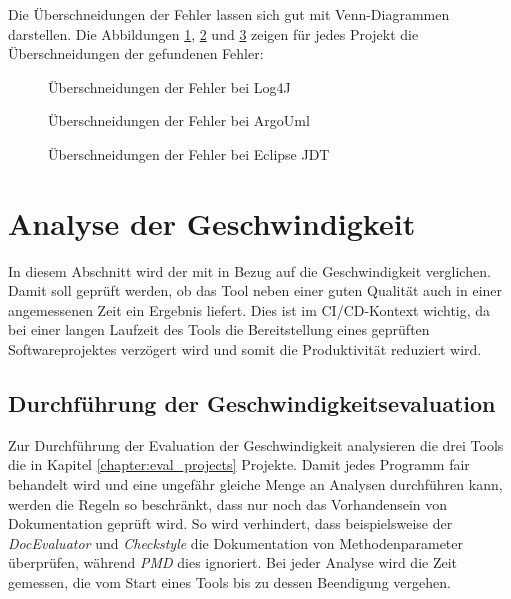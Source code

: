 Die Überschneidungen der Fehler lassen sich gut mit Venn-Diagrammen darstellen.  Die Abbildungen \ref{fig:log4j_venn}, \ref{fig:argo_venn} und  \ref{fig:eclipse_venn} zeigen für jedes Projekt die Überschneidungen der gefundenen Fehler:



\begin{figure}
    \centering

    \caption{Überschneidungen der Fehler bei Log4J}
    \label{fig:log4j_venn}
\end{figure}

\begin{figure}
    \centering

    \caption{Überschneidungen der Fehler bei ArgoUml}
    \label{fig:argo_venn}
\end{figure}
\begin{figure}
    \centering

    \caption{Überschneidungen der Fehler bei Eclipse JDT}
    \label{fig:eclipse_venn}
\end{figure}

\clearpage
 \section{Analyse der Geschwindigkeit}
 In diesem Abschnitt wird der \doceval mit \checkpmd in Bezug auf die Geschwindigkeit verglichen. Damit soll geprüft werden, ob das Tool neben einer guten Qualität auch in einer angemessenen Zeit ein Ergebnis liefert. Dies ist im \ac{CI/CD}-Kontext wichtig, da bei einer langen Laufzeit des Tools  die Bereitstellung eines geprüften Softwareprojektes verzögert wird und somit die Produktivität reduziert wird. 
 
 \subsection{Durchführung der Geschwindigkeitsevaluation}
 Zur Durchführung der Evaluation der Geschwindigkeit analysieren die drei Tools die in Kapitel \ref{chapter:eval_projects} Projekte. Damit jedes Programm fair behandelt wird und eine ungefähr gleiche Menge an Analysen durchführen kann, werden die Regeln so beschränkt, dass nur noch das Vorhandensein von Dokumentation geprüft wird. So wird verhindert, dass beispielsweise der \textit{DocEvaluator} und \textit{Checkstyle} die Dokumentation von Methodenparameter überprüfen, während \textit{PMD} dies ignoriert. Bei jeder Analyse wird die Zeit gemessen, die vom Start eines Tools bis zu dessen Beendigung vergehen. 
 
